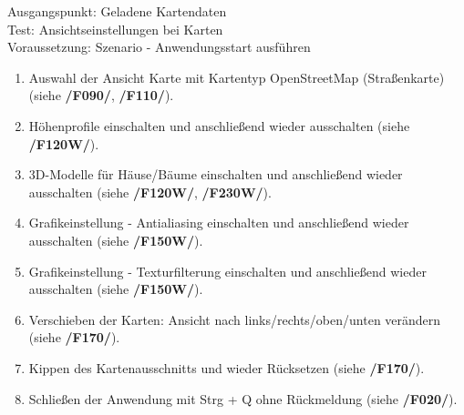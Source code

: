 \documentclass[10pt]{scrreprt}
\begin{document}
\vspace{1.0cm}
Ausgangspunkt: Geladene Kartendaten \\
Test: Ansichtseinstellungen bei Karten \\
Voraussetzung: Szenario - Anwendungsstart ausführen
\begin{enumerate}[leftmargin = 2.5cm, resume]
\item Auswahl der Ansicht Karte mit Kartentyp OpenStreetMap (Straßenkarte) (siehe \textbf{/F090/}, \textbf{/F110/}).
\wunsch
\item Höhenprofile einschalten und anschließend wieder ausschalten (siehe \textbf{/F120W/}).
\item 3D-Modelle für Häuse/Bäume einschalten und anschließend wieder ausschalten (siehe \textbf{/F120W/}, \textbf{/F230W/}).
\item Grafikeinstellung - Antialiasing einschalten und anschließend wieder ausschalten (siehe \textbf{/F150W/}).
\item Grafikeinstellung - Texturfilterung einschalten und anschließend wieder ausschalten (siehe \textbf{/F150W/}).
\muss
\item Verschieben der Karten: Ansicht nach links/rechts/oben/unten verändern (siehe \textbf{/F170/}).
\item Kippen des Kartenausschnitts und wieder Rücksetzen (siehe \textbf{/F170/}).
\item Schließen der Anwendung mit Strg + Q ohne Rückmeldung (siehe \textbf{/F020/}).
\end{enumerate}
\end{document}
